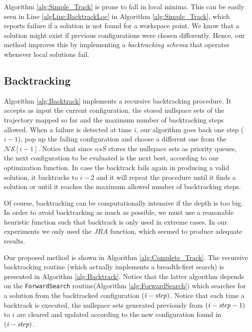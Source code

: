 \documentclass[conference]{IEEEtran}
\newcommand{\nsS}{\ensuremath{\mathcal{NS}}}  %
\begin{document}
Algorithm \ref{alg:Simple_Track} is prone to fall in local minima. This
can be easily seen in Line \ref{algLine:BacktrackLoc} in Algorithm \ref{alg:Simple_Track}, which 
reports failure if a solution is not found for a workspace point. We know that a solution might exist 
if previous configurations were chosen differently. Hence, our method improves this by implementing a
\textit{backtracking schema} that operates whenever local solutions fail. 

\subsection{Backtracking}
Algorithm \ref{alg:Backtrack} implements a recursive backtracking procedure. It accepts as
input the current configuration, the stored nullspace sets of the trajectory mapped so far
and the maximum number of backtracking steps allowed. When a failure is detected at time $i$, our
algorithm goes back one step ($i-1$), pop up the failing configuration and choose a different one 
from the $\nsS[i-1]$. Notice that since $nsS$ stores the nullspace sets as priority queues, the next
configuration to be evaluated is the next best, according to our optimization function. In case the 
backtrack fails again in producing a valid solution, it backtracks to $i-2$ and it will repeat
the procedure until it finds a solution or until it reaches the maximum allowed number of backtracking steps.

Of course, backtracking can be computationally intensive if the depth is too big. In order to avoid
backtracking as much as possible, we must use a reasonable heuristic function such that backtrack is only
used in extreme cases. In our experiments we only used the $JRA$ function, which seemed to produce adequate results.  

Our proposed method is shown in Algorithm \ref{alg:Complete_Track}. The recursive backtracking routine (which actually
implements a breadth-first search) is presented in Algorithm \ref{alg:Backtrack}. Notice that the latter algorithm
depends on the \texttt{ForwardSearch} routine(Algorithm \ref{alg:ForwardSearch}) which searches for a solution from
the backtracked configuration $(\ArgSty{i}-\ArgSty{step})$. Notice that each time a backtrack is executed, the nullspace sets generated previously
from $(\ArgSty{i}-\ArgSty{step}-1)$ to $i$ are cleared and updated according to the new configuration found in  $(\ArgSty{i}- \ArgSty{step})$.
\end{document}
